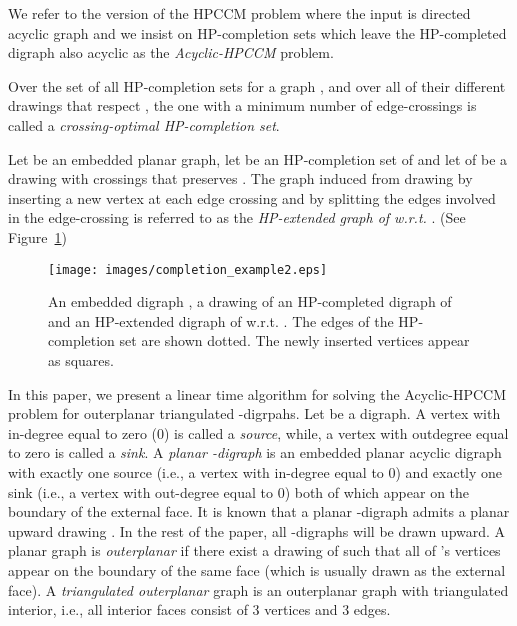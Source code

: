 \documentclass{myllncs-mixalis}
\begin{document}
We refer to the version of the HPCCM problem where the input is
directed acyclic graph and we
 insist on HP-completion
sets which leave the HP-completed digraph also acyclic as the
\emph{Acyclic-HPCCM} problem.

Over the set of all HP-completion sets for a graph , and over all
of their different drawings that respect , the one with a minimum
number of edge-crossings is called a \emph{crossing-optimal
HP-completion set}.


Let  be an embedded  planar graph, let  be an
HP-completion set of  and let  of  be a drawing with  crossings that preserves  .
The graph  induced from drawing  by inserting
a new vertex at each edge crossing and by splitting the edges
involved in the edge-crossing is referred to as the
\emph{HP-extended graph of  w.r.t. }. (See
Figure~\ref{fig:HPextended})






\begin{figure}[htb]
    \begin{minipage}{\textwidth}
    \centering
    \texttt{[image: images/completion\_example2.eps]}
    \caption{An embedded digraph , a drawing  of an HP-completed digraph of 
    and an HP-extended digraph of  w.r.t. . The edges of the HP-completion set are shown dotted.
    The newly inserted vertices appear as squares.}
    \label{fig:HPextended}
  \end{minipage}
\end{figure}

In this paper, we present a linear time algorithm for solving the
Acyclic-HPCCM problem for outerplanar triangulated -digrpahs.
Let  be a  digraph. A vertex  with in-degree equal
to zero (0)  is called a \emph{source}, while, a vertex 
with outdegree equal to zero is called a  \emph{sink}. A
\emph{planar -digraph} is an embedded  planar acyclic digraph
with exactly one source  (i.e., a vertex with in-degree equal to
0) and exactly one sink  (i.e., a vertex with out-degree equal to
0) both of which appear on the boundary of the external face. It is
known that a planar -digraph admits a planar upward drawing
\cite{Kelly87,DiBattistaT88}. In the rest of the paper, all
-digraphs will be drawn upward. A planar graph  is
\emph{outerplanar} if there exist a drawing of  such that all of
's vertices appear on the boundary of the same face (which is
usually drawn as the external face). A \emph{triangulated
outerplanar} graph is an outerplanar graph with triangulated
interior, i.e., all interior faces consist of 3 vertices and 3
edges.
\end{document}
